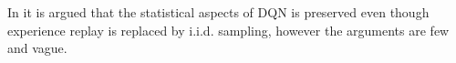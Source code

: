 In  it is argued that the statistical aspects of DQN is preserved
even though experience replay is replaced by i.i.d. sampling,
however the arguments are few and vague.

